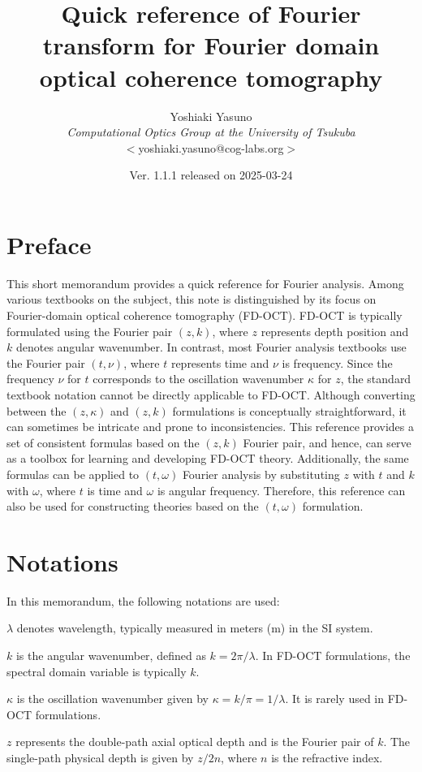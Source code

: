 \documentclass[a4paper]{article}
\title{Quick reference of Fourier transform for Fourier domain optical coherence tomography}
\author{%
	Yoshiaki Yasuno\\
	\textit{Computational Optics Group at the University of Tsukuba}\\
	$<$yoshiaki.yasuno@cog-labs.org$>$
}
\date{Ver. 1.1.1 released on 2025-03-24}
\begin{document}
\maketitle
\tableofcontents

\section{Preface}
This short memorandum provides a quick reference for Fourier analysis.
Among various textbooks on the subject, this note is distinguished by its focus on Fourier-domain optical coherence tomography (FD-OCT).
FD-OCT is typically formulated using the Fourier pair $(z, k)$, where $z$ represents depth position and $k$ denotes angular wavenumber.
In contrast, most Fourier analysis textbooks use the Fourier pair $(t,\nu)$, where $t$ represents time and $\nu$ is frequency.
Since the frequency $\nu$ for $t$ corresponds to the oscillation wavenumber $\kappa$ for $z$, the standard textbook notation cannot be directly applicable to FD-OCT.
Although converting between the $(z,\kappa)$ and $(z,k)$ formulations is conceptually straightforward, it can sometimes be intricate and prone to inconsistencies.
This reference provides a set of consistent formulas based on the $(z, k)$ Fourier pair, and hence, can serve as a toolbox for learning and developing FD-OCT theory.
Additionally, the same formulas can be applied to  $(t, \omega)$ Fourier analysis by substituting $z$ with $t$ and $k$ with $\omega$, where $t$ is time and $\omega$ is angular frequency.
Therefore, this reference can also be used for constructing theories based on the $(t, \omega)$ formulation.

\section{Notations}
In this memorandum, the following notations are used:

$\lambda$ denotes wavelength, typically measured in meters (m) in the SI system.

$k$ is the angular wavenumber, defined as $k = 2\pi/\lambda$.
In FD-OCT formulations, the spectral domain variable is typically $k$.

$\kappa$ is the oscillation wavenumber given by $\kappa = k/\pi= 1/\lambda$.
It is rarely used in FD-OCT formulations.

$z$ represents the double-path axial optical depth and is the Fourier pair of  $k$.
The single-path physical depth is given by $z/2n$, where $n$ is the refractive index.
\end{document}
